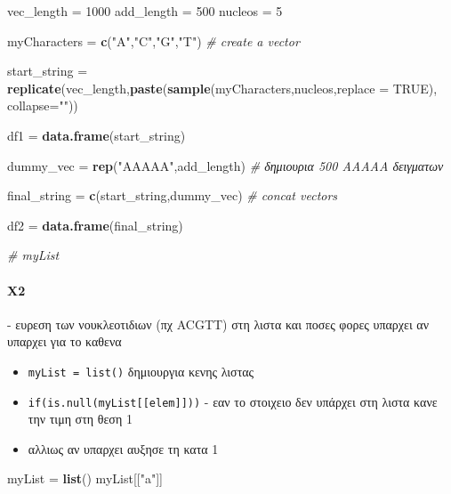 \documentclass[
]{article}
\newenvironment{Shaded}{\begin{snugshade}}{\end{snugshade}}
\newcommand{\AttributeTok}[1]{\textcolor[rgb]{0.13,0.29,0.53}{#1}}
\newcommand{\CommentTok}[1]{\textcolor[rgb]{0.56,0.35,0.01}{\textit{#1}}}
\newcommand{\ConstantTok}[1]{\textcolor[rgb]{0.56,0.35,0.01}{#1}}
\newcommand{\DecValTok}[1]{\textcolor[rgb]{0.00,0.00,0.81}{#1}}
\newcommand{\FunctionTok}[1]{\textcolor[rgb]{0.13,0.29,0.53}{\textbf{#1}}}
\newcommand{\NormalTok}[1]{#1}
\newcommand{\OtherTok}[1]{\textcolor[rgb]{0.56,0.35,0.01}{#1}}
\newcommand{\StringTok}[1]{\textcolor[rgb]{0.31,0.60,0.02}{#1}}
\begin{document}
\begin{Shaded}
\begin{Highlighting}[]
\NormalTok{vec\_length }\OtherTok{=} \DecValTok{1000} 
\NormalTok{add\_length }\OtherTok{=} \DecValTok{500}
\NormalTok{nucleos }\OtherTok{=} \DecValTok{5}

\NormalTok{myCharacters }\OtherTok{=} \FunctionTok{c}\NormalTok{(}\StringTok{"A"}\NormalTok{,}\StringTok{"C"}\NormalTok{,}\StringTok{"G"}\NormalTok{,}\StringTok{"T"}\NormalTok{) }\CommentTok{\# create a vector }


\NormalTok{start\_string }\OtherTok{=} \FunctionTok{replicate}\NormalTok{(vec\_length,}\FunctionTok{paste}\NormalTok{(}\FunctionTok{sample}\NormalTok{(myCharacters,nucleos,}\AttributeTok{replace =} \ConstantTok{TRUE}\NormalTok{), }\AttributeTok{collapse=}\StringTok{""}\NormalTok{))}


\NormalTok{df1 }\OtherTok{=} \FunctionTok{data.frame}\NormalTok{(start\_string)}


\NormalTok{dummy\_vec }\OtherTok{=} \FunctionTok{rep}\NormalTok{(}\StringTok{"AAAAA"}\NormalTok{,add\_length) }\CommentTok{\# δημιουρια 500 ΑΑΑΑΑ δειγματων}

\NormalTok{final\_string }\OtherTok{=} \FunctionTok{c}\NormalTok{(start\_string,dummy\_vec) }\CommentTok{\# concat vectors }


\NormalTok{df2 }\OtherTok{=} \FunctionTok{data.frame}\NormalTok{(final\_string)}


\CommentTok{\# myList}
\end{Highlighting}
\end{Shaded}

\paragraph{X2}\label{x2}

- ευρεση των νουκλεοτιδιων (πχ ACGTT) στη λιστα και ποσες φορες υπαρχει
αν υπαρχει για το καθενα

\begin{itemize}
\item
  \texttt{myList\ =\ list()} δημιουργια κενης λιστας
\item
  \texttt{if(is.null(myList{[}{[}elem{]}{]}))} - εαν το στοιχειο δεν
  υπάρχει στη λιστα κανε την τιμη στη θεση 1
\item
  αλλιως αν υπαρχει αυξησε τη κατα 1
\end{itemize}

\begin{Shaded}
\begin{Highlighting}[]
\NormalTok{myList }\OtherTok{=} \FunctionTok{list}\NormalTok{() }
\NormalTok{myList[[}\StringTok{"a"}\NormalTok{]]}
\end{Highlighting}
\end{Shaded}
\end{document}

